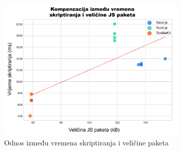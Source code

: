 \begin{figure}[H]
    \centering
    \includegraphics[width=0.8\textwidth]{slike/rezultati/dodatne-metrike/performance_vs_bundle_size_tradeoff.png}
    \caption{Odnos između vremena skriptiranja i veličine paketa}
    \label{fig:performance_vs_bundle_size_tradeoff}
\end{figure}
